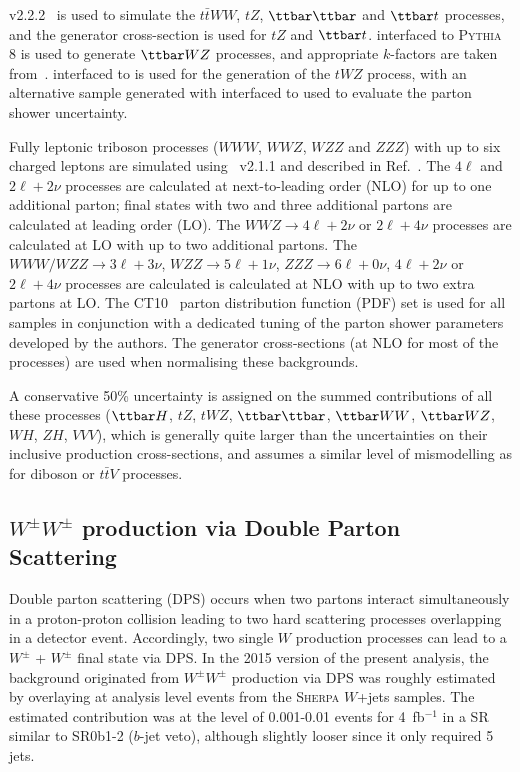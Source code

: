 \MADGRAPH v2.2.2~\cite{Alwall:2011uj} is used to simulate the $t\bar{t}WW$, $tZ$, $\ttbar\ttbar$ and $\ttbar t$ processes, and the generator cross-section is used for $tZ$ and $\ttbar t$. \MADGRAPH interfaced to \textsc{Pythia} 8 is used to generate $\ttbar WZ$ processes, and appropriate $k$-factors are taken from~\cite{Alwall:2014hca}. \AMCATNLO interfaced to  is used for the generation of the $tWZ$ process, with an alternative sample generated with \AMCATNLO interfaced to \HERWIG used to evaluate the parton shower uncertainty.  

Fully leptonic triboson processes ($WWW$, $WWZ$, $WZZ$ and $ZZZ$) with up to six charged leptons are simulated using \SHERPA~v2.1.1 
and described in Ref.~\cite{ATL-PHYS-PUB-2016-002}. 
The $4\ell$ and $2\ell+2\nu$ processes are calculated at next-to-leading order (NLO) for up to one additional parton; 
final states with two and three additional partons are calculated at leading order (LO). 
The $WWZ\to 4\ell+2\nu$ or $2\ell+4\nu$ processes are calculated at LO with up to two additional partons. 
The $WWW/WZZ\to 3\ell+3\nu$, $WZZ\to 5\ell+1\nu$, $ZZZ\to 6\ell+0\nu$, $4\ell+2\nu$ or $2\ell+4\nu$ processes 
are calculated is calculated at NLO with up to two extra partons at LO. 
The CT10~\cite{Lai:2010vv} parton distribution function (PDF) set is used for all \SHERPA samples in conjunction with 
a dedicated tuning of the parton shower parameters developed by the \SHERPA authors. 
The generator cross-sections (at NLO for most of the processes) are used when normalising these backgrounds.

A conservative 50\% uncertainty is assigned on the summed contributions 
of all these processes ($\ttbar H$, $tZ$, $tWZ$, $\ttbar\ttbar$, $\ttbar WW$, $\ttbar WZ$, $WH$, $ZH$, $VVV$), 
which is generally quite larger than the uncertainties on their inclusive production cross-sections, 
and assumes a similar level of mismodelling as for diboson or $t\bar t V$ processes. 


\subsection{$W^\pm W^\pm$ production via Double Parton Scattering}
\label{subsec:dps}

Double parton scattering (DPS) occurs when two partons interact simultaneously in a proton-proton collision leading to two hard scattering processes overlapping in a detector event. 
Accordingly, two single $W$ production processes can lead to a $W^\pm$ + $W^\pm$ final state via DPS. 
In the 2015 version of the present analysis, the background originated from $W^\pm W^\pm$ production via DPS was roughly estimated by overlaying at analysis level events from the \textsc{Sherpa} $W$+jets samples. The estimated contribution was at the level of 0.001-0.01 events for 4~fb$^{-1}$ in a SR similar to SR0b1-2 ($b$-jet veto), although slightly looser since it only required 5 jets.


